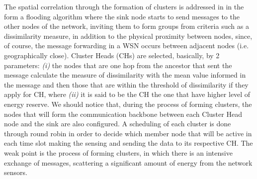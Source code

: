 \documentclass[conference]{IEEEtran}
\begin{document}
The spatial correlation through the formation of clusters is addressed in
\cite{Pham2010} in the form a flooding algorithm where the sink node starts to
send messages to the other nodes of the network, inviting them to form groups
from criteria such as a dissimilarity measure, in addition to the physical
proximity between nodes, since, of course, the message forwarding in a WSN
occurs between adjacent nodes (i.e. geographically close). Cluster Heads (CHs)
are selected, basically, by 2 parameters: {\it (i)} the nodes that are one hop
from the ancestor that sent the message calculate the measure of dissimilarity
with the mean value informed in the message and then those that are within the
threshold of dissimilarity if they apply for CH, where {\it (ii)} it is said to
be the CH the one that have higher level of energy reserve.
We should notice that, during the process of forming clusters, the nodes that
will form the communication backbone between each Cluster Head node and the sink
are also configured. A scheduling of each cluster is done through round robin in
order to decide which member node that will be active in each time slot making
the sensing and sending the data to its respective CH.
The weak point is the process of forming clusters, in
which there is an intensive exchange of messages, scattering a significant
amount of energy from the network sensors.
\end{document}
